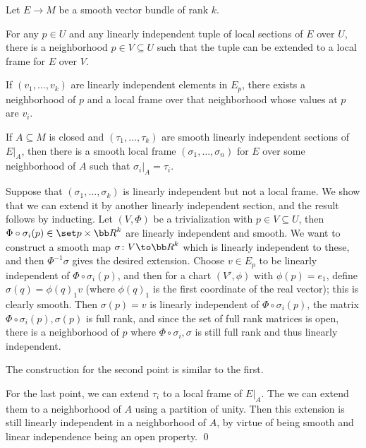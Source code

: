 \edefn

\bprop

    Let $E\to M$ be a smooth vector bundle of rank $k$.
    \benum
        \item For any $p\in U$ and any linearly independent tuple of local sections of $E$ over $U$, there is a neighborhood $p\in V\subseteq U$
        such that the tuple can be extended to a local frame for $E$ over $V$.
        \item If $(v_1,\dots,v_k)$ are linearly independent elements in $E_p$, there exists a neighborhood of $p$ and a local frame over that neighborhood
        whose values at $p$ are $v_i$.
        \item If $A\subseteq M$ is closed and $(\tau_1,\dots,\tau_k)$ are smooth linearly independent sections of $E|_A$, then there is a smooth local frame
        $(\sigma_1,\dots,\sigma_n)$ for $E$ over some neighborhood of $A$ such that $\sigma_i|_A=\tau_i$.
    \eenum

\eprop

\bproof

    Suppose that $(\sigma_1,\dots,\sigma_k)$ is linearly independent but not a local frame.
    We show that we can extend it by another linearly independent section, and the result follows by inducting.
    Let $(V,\Phi)$ be a trivialization with $p\in V\subseteq U$, then $\Phi\circ\sigma_i(p)\in\set p\times\bR^k$ are linearly independent and smooth.
    We want to construct a smooth map $\sigma\colon V\to\bR^k$ which is linearly independent to these, and then $\Phi^{-1}\sigma$ gives the desired extension.
    Choose $v\in E_p$ to be linearly independent of $\Phi\circ\sigma_i(p)$, and then for a chart $(V',\phi)$ with $\phi(p)=e_1$, define $\sigma(q)=\phi(q)_1v$ (where
    $\phi(q)_1$ is the first coordinate of the real vector); this is clearly smooth.
    Then $\sigma(p)=v$ is linearly independent of $\Phi\circ\sigma_i(p)$, the matrix $\Phi\circ\sigma_i(p),\sigma(p)$ is full rank, and since the set of full rank
    matrices is open, there is a neighborhood of $p$ where $\Phi\circ\sigma_i,\sigma$ is still full rank and thus linearly independent.

    The construction for the second point is similar to the first.

    For the last point, we can extend $\tau_i$ to a local frame of $E|_A$.
    The we can extend them to a neighborhood of $A$ using a partition of unity.
    Then this extension is still linearly independent in a neighborhood of $A$, by virtue of being smooth and linear independence being an open property.
    \qed

